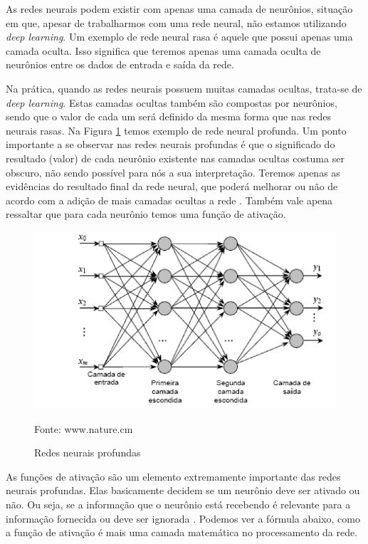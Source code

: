 \documentclass[openright]{UFRGS} %
\begin{document}
As redes neurais podem existir com apenas uma camada de neurônios, situação em que, apesar de trabalharmos com uma rede neural, não estamos utilizando \textit{deep learning}.
Um exemplo de rede neural rasa é aquele que possui apenas uma camada oculta. Isso significa que teremos apenas uma camada oculta de neurônios entre os dados de entrada e saída da rede.

Na prática, quando as redes neurais possuem muitas camadas ocultas, trata-se de \textit{deep learning}. Estas camadas ocultas também são compostas por neurônios, sendo que o valor de cada um será definido da mesma forma que nas redes neurais rasas. Na Figura \ref{fig:redesneuraisprof} temos exemplo de rede neural profunda. Um ponto importante a se observar nas redes neurais profundas é que o significado do resultado (valor) de cada neurônio existente nas camadas ocultas costuma ser obscuro, não sendo possível para nós a sua interpretação. Teremos apenas as evidências do resultado final da rede neural, que poderá melhorar ou não de acordo com a adição de mais camadas ocultas a rede \cite{goodfellow2016deep}. Também vale apena ressaltar que para cada neurônio temos uma função de ativação.

\begin{figure}[h]
    \centering
    \caption{Redes neurais profundas}
    \includegraphics[scale=0.40]{redesneuraisprofundas.png}
    \centerline{Fonte: www.nature.cm}
    \label{fig:redesneuraisprof}
\end{figure}


As funções de ativação são um elemento extremamente importante das redes neurais profundas. Elas basicamente decidem se um neurônio deve ser ativado ou não. Ou seja, se a informação que o neurônio está recebendo é relevante para a informação fornecida ou deve ser ignorada \cite{goodfellow2016deep}. Podemos ver a fórmula abaixo, como a função de ativação é mais uma camada matemática no processamento da rede.
\end{document}
